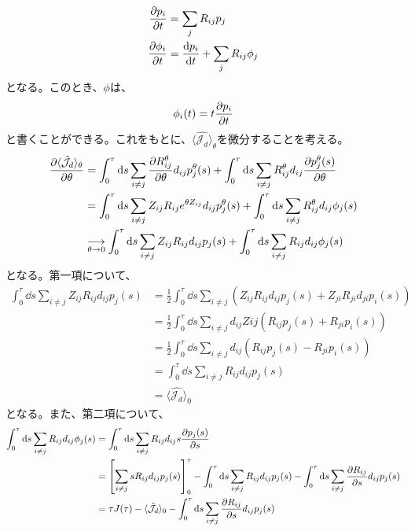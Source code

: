 \documentclass[a4paper,11pt]{jsarticle}
\numberwithin{equation}{section}
\begin{document}
\begin{align}
    \pdv{p_{i}}{t} &= \sum_{j} R_{ij}p_{j}\\
    \pdv{\phi_{i}}{t} &= \dv{p_{i}}{t} + \sum_{j} R_{ij}\phi_{j}
\end{align}
となる。このとき、$\phi$は、
\begin{align}
    \phi_{i}(t) = t\pdv{p_{i}}{t} 
\end{align}
と書くことができる。これをもとに、$\langle \hat{\mathcal{J}_d} \rangle_\theta$を微分することを考える。
\begin{align}
    \pdv{\langle \hat{\mathcal{J}_d} \rangle_\theta}{\theta} &= \int_0^\tau \dd{s} \sum_{i \neq j} \pdv{R_{ij}^{\theta}}{\theta}d_{ij}p_j^{\theta}(s) + \int_0^\tau \dd{s} \sum_{i \neq j} R_{ij}^{\theta}d_{ij}\pdv{p_j^{\theta}(s)}{\theta}\\
    &= \int_0^\tau \dd{s} \sum_{i \neq j}Z_{ij} R_{ij}e^{\theta Z_{ij}}d_{ij}p_j^{\theta}(s) + \int_0^\tau \dd{s} \sum_{i \neq j} R_{ij}^{\theta}d_{ij}\phi_j(s)\\
    &\underset{\theta \to 0}{\longrightarrow} \int_0^\tau \dd{s} \sum_{i \neq j} Z_{ij}R_{ij}d_{ij}p_j(s) + \int_0^\tau \dd{s} \sum_{i \neq j} R_{ij}d_{ij}\phi_j(s)
\end{align}
となる。第一項について、
\begin{align}
    \int_0^\tau \dd{s} \sum_{i \neq j} Z_{ij}R_{ij}d_{ij}p_j(s) 
    &= \frac{1}{2} \int_0^\tau \dd{s} \sum_{i \neq j} (Z_{ij}R_{ij}d_{ij}p_j(s) + Z_{ji}R_{ji}d_{ji}p_i(s))\\
    &= \frac{1}{2} \int_0^\tau \dd{s} \sum_{i \neq j} d_{ij}Z{ij}(R_{ij}p_j(s) + R_{ji}p_i(s))\\
    &= \frac{1}{2} \int_0^\tau \dd{s} \sum_{i \neq j} d_{ij}(R_{ij}p_j(s) - R_{ji}p_i(s))\\
    &= \int_{0}^{\tau} \dd{s} \sum_{i \neq j} R_{ij}d_{ij}p_j(s)\\
    &= \langle \hat{\mathcal{J}_d} \rangle_0
\end{align}
となる。また、第二項について、
\begin{align}
    \int_0^\tau \dd{s} \sum_{i \neq j} R_{ij}d_{ij}\phi_j(s) 
    &= \int_0^\tau \dd{s} \sum_{i \neq j} R_{ij}d_{ij}s\pdv{p_j(s)}{s} \\
    &= \left[\sum_{i \neq j}sR_{ij}d_{ij}p_j(s)\right]_0^\tau - \int_{0}^{\tau} \dd{s} \sum_{i \neq j} R_{ij}d_{ij}p_j(s) - \int_{0}^{\tau} \dd{s} \sum_{i \neq j} \pdv{R_{ij}}{s}d_{ij}p_j(s)\\
    &= \tau J(\tau)- \langle \hat{\mathcal{J}_d} \rangle_0 - \int_{0}^{\tau} \dd{s} \sum_{i \neq j} \pdv{R_{ij}}{s}d_{ij}p_j(s)\\
\end{align}
\end{document}
